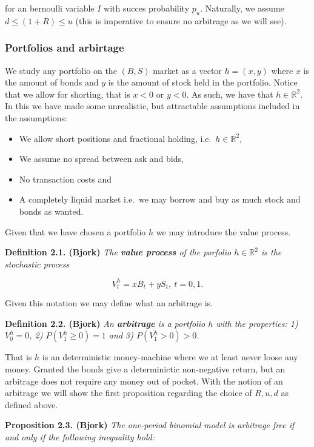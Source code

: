 \documentclass[
]{book}
\providecommand{\tightlist}{%
  \setlength{\itemsep}{0pt}\setlength{\parskip}{0pt}}
\begin{document}
for an bernoulli variable \(I\) with succes probability \(p_u\). Naturally, we assume \(d\le (1+R)\le u\) (this is imperative to ensure no arbitrage as we will see).

\hypertarget{portfolios-and-arbirtage}{%
\subsubsection{Portfolios and arbirtage}\label{portfolios-and-arbirtage}}

We study any portfolio on the \((B,S)\) market as a vector \(h=(x,y)\) where \(x\) is the amount of bonds and \(y\) is the amount of stock held in the portfolio. Notice that we allow for shorting, that is \(x<0\) or \(y<0\). As such, we have that \(h\in \mathbb{R}^2\). In this we have made some unrealistic, but attractable assumptions included in the assumptions:

\begin{itemize}
\tightlist
\item
  We allow short positions and fractional holding, i.e.~\(h\in \mathbb{R}^2\),
\item
  We assume no spread between ask and bids,
\item
  No transaction costs and
\item
  A completely liquid market i.e.~we may borrow and buy as much stock and bonds as wanted.
\end{itemize}

Given that we have chosen a portfolio \(h\) we may introduce the value process.

\textbf{Definition 2.1. (Bjork)} \emph{The \textbf{value process} of the porfolio \(h\in\mathbb{R}^2\) is the stochastic process}

\[V^h_t=xB_t+yS_t,\ t=0,1.\]

Given this notation we may define what an arbitrage is.

\textbf{Definition 2.2. (Bjork)} \emph{An \textbf{arbitrage} is a portfolio \(h\) with the properties: 1) \(V^h_0=0\), 2) \(P(V^h_1\ge 0)=1\) and 3) \(P(V^h_1>0)>0\).}

That is \(h\) is an deterministic money-machine where we at least never loose any money. Granted the bonds give a determinictic non-negative return, but an arbitrage does not require any money out of pocket. With the notion of an arbitrage we will show the first proposition regarding the choice of \(R,u,d\) as defined above.

\textbf{Proposition 2.3. (Bjork)} \emph{The one-period binomial model is arbitrage free if and only if the following inequality hold:}
\end{document}
